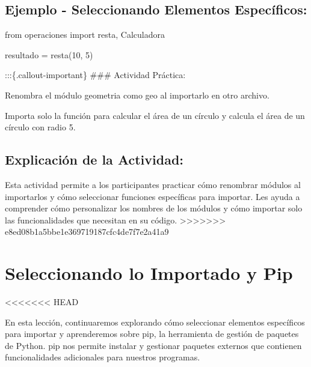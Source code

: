 \documentclass[
  a4paper,
  onepage,
  openany]{scrreprt}
\newenvironment{Shaded}{\begin{snugshade}}{\end{snugshade}}
\newcommand{\DecValTok}[1]{\textcolor[rgb]{0.68,0.00,0.00}{#1}}
\newcommand{\ImportTok}[1]{\textcolor[rgb]{0.00,0.46,0.62}{#1}}
\newcommand{\NormalTok}[1]{\textcolor[rgb]{0.00,0.23,0.31}{#1}}
\newcommand{\OperatorTok}[1]{\textcolor[rgb]{0.37,0.37,0.37}{#1}}
\begin{document}
\hypertarget{ejemplo---seleccionando-elementos-especuxedficos-1}{%
\section{Ejemplo - Seleccionando Elementos
Específicos:}\label{ejemplo---seleccionando-elementos-especuxedficos-1}}

\begin{Shaded}
\begin{Highlighting}[]
\ImportTok{from}\NormalTok{ operaciones }\ImportTok{import}\NormalTok{ resta, Calculadora}

\NormalTok{resultado }\OperatorTok{=}\NormalTok{ resta(}\DecValTok{10}\NormalTok{, }\DecValTok{5}\NormalTok{)}
\end{Highlighting}
\end{Shaded}

:::\{.callout-important\} \#\#\# Actividad Práctica:

Renombra el módulo geometria como geo al importarlo en otro archivo.

Importa solo la función para calcular el área de un círculo y calcula el
área de un círculo con radio 5.

\hypertarget{explicaciuxf3n-de-la-actividad-61}{%
\section{Explicación de la
Actividad:}\label{explicaciuxf3n-de-la-actividad-61}}

Esta actividad permite a los participantes practicar cómo renombrar
módulos al importarlos y cómo seleccionar funciones específicas para
importar. Les ayuda a comprender cómo personalizar los nombres de los
módulos y cómo importar solo las funcionalidades que necesitan en su
código.
\textgreater\textgreater\textgreater\textgreater\textgreater\textgreater\textgreater{}
e8ed08b1a5bbe1e369719187cfc4de7f7e2a41a9

\hypertarget{seleccionando-lo-importado-y-pip}{%
\chapter{Seleccionando lo Importado y
Pip}\label{seleccionando-lo-importado-y-pip}}

\textless\textless\textless\textless\textless\textless\textless{} HEAD

En esta lección, continuaremos explorando cómo seleccionar elementos
específicos para importar y aprenderemos sobre pip, la herramienta de
gestión de paquetes de Python. pip nos permite instalar y gestionar
paquetes externos que contienen funcionalidades adicionales para
nuestros programas.
\end{document}
